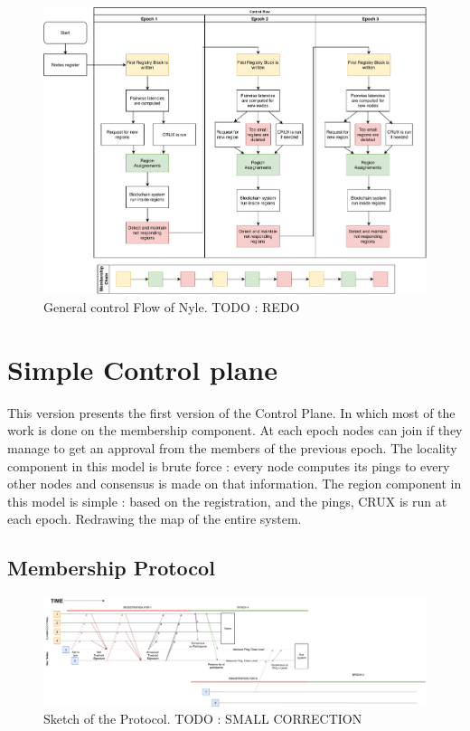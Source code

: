 \documentclass[a4paper,11pt,oneside]{report}
\begin{document}
\begin{figure}[!h] 
\centering
\includegraphics[width=400pt]{figures/Nyle_controlflow}
\caption{General control Flow of Nyle. \color{red} TODO : REDO \color{black}}
\label{fig:controlflow}
\end{figure}

\section{Simple Control plane} This version presents the first
version of the Control Plane. In which most of the work is done on the
membership component. At each epoch nodes can join if they manage to get an
approval from the members of the previous epoch. The locality component in this
model is brute force : every node computes its pings to every other nodes and
consensus is made on that information. The region component in this model is
simple : based on the registration, and the pings, CRUX is run at each
epoch. Redrawing the map of the entire system. 

\subsection{Membership Protocol}

\begin{figure}
\centering
\includegraphics[width=700pt]{figures/Registrationprotocol}
\caption{Sketch of the Protocol. \color{red} TODO : SMALL CORRECTION \color{black}}
\label{fig:registrationprotocol}
\end{figure}
\end{document}
